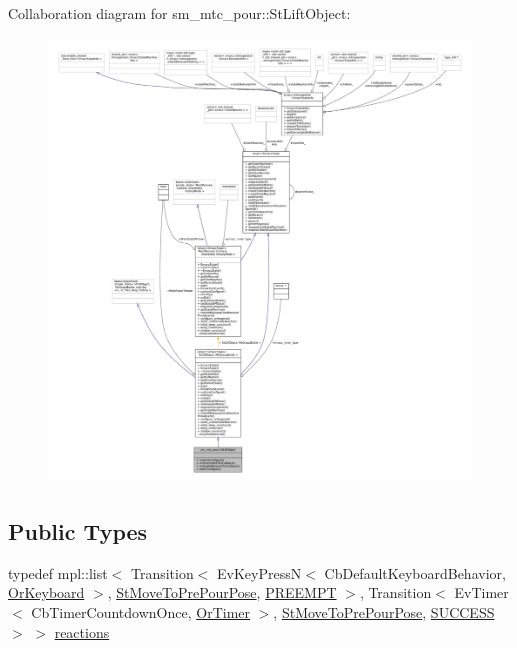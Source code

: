 Collaboration diagram for sm\+\_\+mtc\+\_\+pour\+:\+:St\+Lift\+Object\+:
\nopagebreak
\begin{figure}[H]
\begin{center}
\leavevmode
\includegraphics[width=350pt]{structsm__mtc__pour_1_1StLiftObject__coll__graph}
\end{center}
\end{figure}
\subsection*{Public Types}
\begin{DoxyCompactItemize}
\item 
typedef mpl\+::list$<$ Transition$<$ Ev\+Key\+PressN$<$ Cb\+Default\+Keyboard\+Behavior, \hyperlink{classsm__mtc__pour_1_1OrKeyboard}{Or\+Keyboard} $>$, \hyperlink{structsm__mtc__pour_1_1StMoveToPrePourPose}{St\+Move\+To\+Pre\+Pour\+Pose}, \hyperlink{classPREEMPT}{P\+R\+E\+E\+M\+PT} $>$, Transition$<$ Ev\+Timer$<$ Cb\+Timer\+Countdown\+Once, \hyperlink{classsm__mtc__pour_1_1OrTimer}{Or\+Timer} $>$, \hyperlink{structsm__mtc__pour_1_1StMoveToPrePourPose}{St\+Move\+To\+Pre\+Pour\+Pose}, \hyperlink{classSUCCESS}{S\+U\+C\+C\+E\+SS} $>$ $>$ \hyperlink{structsm__mtc__pour_1_1StLiftObject_af88d0c09bc3731ad7a14be4543f48e37}{reactions}
\end{DoxyCompactItemize}
